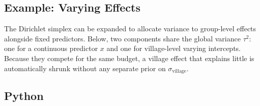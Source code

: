 \documentclass[
  letterpaper,
  DIV=11,
  numbers=noendperiod]{scrartcl}
\begin{document}
\subsection{Example: Varying Effects}\label{example-varying-effects}

The Dirichlet simplex can be expanded to allocate variance to
group-level effects alongside fixed predictors. Below, two components
share the global variance \(\tau^2\): one for a continuous predictor
\(x\) and one for village-level varying intercepts. Because they compete
for the same budget, a village effect that explains little is
automatically shrunk without any separate prior on
\(\sigma_{\text{village}}\).

\subsection{Python}
\end{document}

